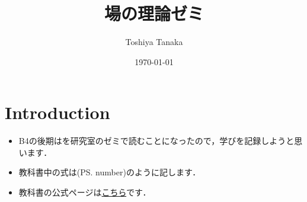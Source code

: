 \documentclass[english, dvipdfmx, a4paper]{jsarticle}
\title{場の理論ゼミ}
\author{Toshiya Tanaka}
\date{\today}
\theoremstyle{break}
\numberwithin{equation}{section}
\newcommand{\textref}[1]{(PS. #1)}
\begin{document}
	\maketitle
	\section{Introduction}
	\begin{itemize}
		\item B4の後期は\cite{Peskin1995}を研究室のゼミで読むことになったので，学びを記録しようと思います．
		\item 教科書中の式は\textref{number}のように記します．
	\item 教科書の公式ページは\href{https://physics.weber.edu/schroeder/qftbook.html}{こちら}です．
	\end{itemize}
	
	
	
	
	
	
\end{document}
